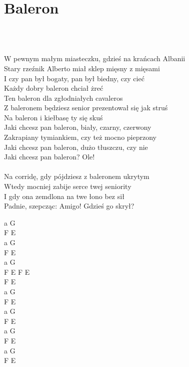 \documentclass[a5paper, 10pt]{book}
\begin{document}
\newpage
\section{Baleron}\textcolor{lightgray}{\textit{}}\\~\\
\begin{minipage}[t]{0.8\textwidth}
  W pewnym małym miasteczku, gdzieś na krańcach Albanii\\
  Stary rzeźnik Alberto miał sklep mięsny z mięsami\\
  I czy pan był bogaty, pan był biedny, czy cieć\\
  Każdy dobry baleron chciał żreć\\

  \hspace*{8mm}Ten baleron dla zgłodniałych cavaleros\\
  \hspace*{8mm}Z baleronem będziesz senior prezentował się jak struś\\
  \hspace*{8mm}Na baleron i kiełbasę ty się skuś\\

  Jaki chcesz pan baleron, biały, czarny, czerwony\\
  Zakrapiany tymiankiem, czy też mocno pieprzony\\
  Jaki chcesz pan baleron, dużo tłuszczu, czy nie\\
  Jaki chcesz pan baleron? Ole!\\
  \\
  Na corridę, gdy pójdziesz z baleronem ukrytym\\
  Wtedy mocniej zabije serce twej seniority\\
  I gdy ona zemdlona na twe łono bez sił\\
  Padnie, szepcząc: Amigo! Gdzieś go skrył?\\
\end{minipage}
\begin{minipage}[t]{0.2\textwidth}
  a G\\
  F E\\
  a G\\
  F E\\

  a G \\
  F E F E\\
  F E \\

  a G\\
  F E\\
  a G\\
  F E\\

  a G\\
  F E\\
  a G\\
  F E\\
\end{minipage}
\end{document}
